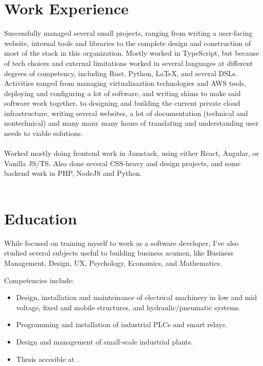 \documentclass[11pt,a4paper,sans]{moderncv}
\begin{document}
\section{Work Experience}
{
{\flushleft Successfully managed several small projects, ranging from writing a user-facing website, internal tools and libraries to the complete design and construction of most of the stack in this organization. Mostly worked in TypeScript, but because of tech choices and external limitations worked in several languages at different degrees of competency, including Rust, Python, LaTeX, and several DSLs. Activities ranged from managing virtualizaztion technologies and AWS tools, deploying and configuring a lot of software, and writing shims to make said software work together, to designing and building the current private cloud infrastructure, writing several websites, a lot of documentation (technical and nontechnical) and many many many hours of translating and understanding user needs to viable solutions.   } \hfill \\[-1em]
\hfill \\[1em]

{\flushleft Worked mostly doing frontend work in Jamstack, using either React, Angular, or Vanilla JS/TS. Also done several CSS-heavy and design projects, and some backend work in PHP, NodeJS and Python.} \hfill \\[-1em]
\hfill \\




\section{Education}
{\flushleft While focused on training myself to work as a software developer, I've also studied several subjects useful to building business acumen, like Business Management, Design, UX, Psychology, Economics, and Mathematics.}
\hfill \\[1em]

{\flushleft Competencies include: \begin{itemize}
		\item Design, installation and mainteinance of electrical machinery in low and mid voltage, fixed and mobile structures, and hydraulic/pneumatic systems.
		\item Programming and installation of industrial PLCs and smart relays.
		\item Design and management of small-scale industrial plants.
		\item Thesis accesible at \href{https://goo.gl/JtjfTV}{\color{blue}{goo.gl/JtjfTV}}.
	\end{itemize}
	\hfill \\[2em]
}

}
\end{document}
